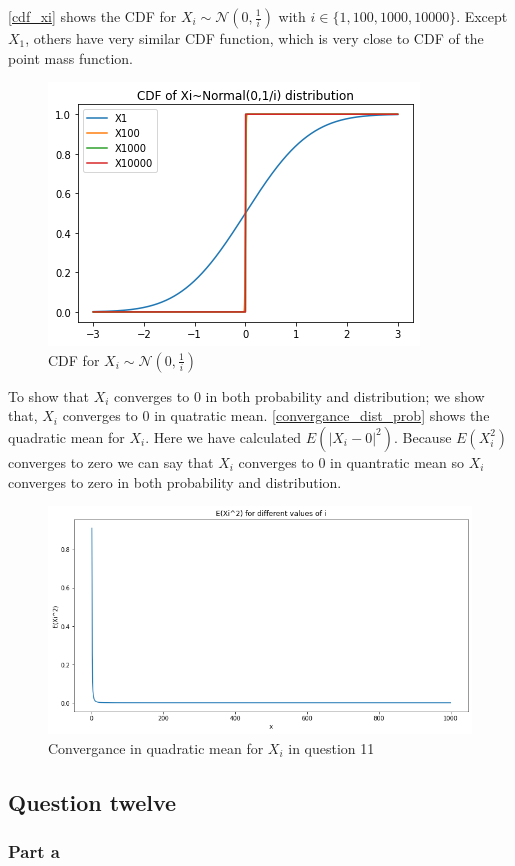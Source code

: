 \documentclass[12pt, a4paper]{book}
\begin{document}
\autoref{cdf_xi} shows the CDF for $X_i \sim \mathcal{N}(0,\frac{1}{i})$ with $i \in \{1, 100, 1000, 10000\}$.
Except $X_1$, others have very similar CDF function, which is very close to CDF of the point mass function.

\begin{figure}[h]
    \centering
    \includegraphics[width=0.5\linewidth]{images/question11/cdf.png}
    \caption{CDF for $X_i \sim \mathcal{N}(0,\frac{1}{i})$}
    \label{cdf_xi}
\end{figure}

To show that $X_i$ converges to $0$ in both probability and distribution; we show that,
$X_i$ converges to $0$ in quatratic mean. \autoref{convergance_dist_prob} shows the quadratic mean
for $X_i$. Here we have calculated $E(|X_i-0|^2)$. Because $E(X_i^2)$ converges to zero we can say
that $X_i$ converges to 0 in quantratic mean so $X_i$ converges to zero in both probability and
distribution.

\begin{figure}[h]
    \centering
    \includegraphics[width=0.5\linewidth]{images/question11/convergance_dist_prob.png}
    \caption{Convergance in quadratic mean for $X_i$ in question 11}
    \label{convergance_dist_prob}
\end{figure}

\subsection*{Question twelve}

\subsubsection*{Part a}
\end{document}
